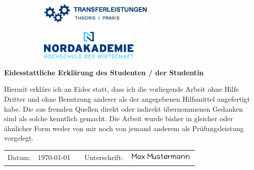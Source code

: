 \pagebreak
\thispagestyle{empty}

\setlength{\parindent}{0pt}

\begin{figure}[t]
	\vspace*{-2.9\baselineskip}
	\begin{subfigure}[b]{0.6\textwidth}
		\includegraphics[height=1cm, left]{image/transferleistung}
	\end{subfigure}
	\begin{subfigure}[b]{0.4\textwidth}
		\includegraphics[height=1.4cm, right]{image/nak_new_logo_big}
	\end{subfigure}
\end{figure}
\begin{figure}[t]
\end{figure}


\vspace*{\fill}

\large
\textcolor{blue!30!black}{\textbf{Eidesstattliche Erklärung des Studenten / der Studentin }}
\newline

\normalsize
Hiermit erkläre ich an Eides statt, dass ich die vorliegende Arbeit ohne Hilfe Dritter und ohne
Benutzung anderer als der angegebenen Hilfsmittel angefertigt habe. Die aus fremden
Quellen direkt oder indirekt übernommenen Gedanken sind als solche kenntlich gemacht.
Die Arbeit wurde bisher in gleicher oder ähnlicher Form weder von mir noch von jemand
anderem als Prüfungsleistung vorgelegt.
\newline

\begin{tabular}{ p{1.2cm}p{4.5cm}p{2cm}p{2cm}p{4.5cm} }
    Datum: & \today & & Unterschrift: & \includegraphics[height=20px]{image/signature.png}\\\cline{2-2}\cline{5-5}
\end{tabular}

\vspace*{\fill}
